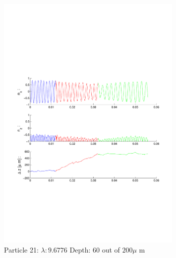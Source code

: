 \begin{figure}[H]

\includegraphics[width=0.8\textwidth]{Images/Particle 21/Particle21.pdf}

\caption{Particle 21:  $ \lambda: 9.6776$ Depth: 60 out of $200 \mu $ m}

\centering

\end{figure}

